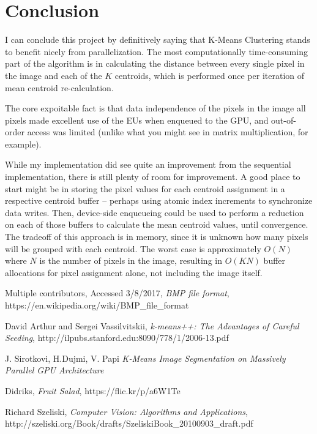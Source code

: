 \documentclass[11pt]{article}
\begin{document}
\section{Conclusion}

I can conclude this project by definitively saying that K-Means Clustering stands to benefit nicely from
parallelization. The most computationally time-consuming part of the algorithm is in calculating the
distance between every single pixel in the image and each of the $K$ centroids, which is performed once
per iteration of mean centroid re-calculation.

The core expoitable fact is that data independence of the pixels in the image all pixels
made excellent use of the EUs when enqueued to the GPU, and out-of-order access was limited (unlike what
you might see in matrix multiplication, for example).

While my implementation did see quite an improvement from the sequential implementation, there is still
plenty of room for improvement. A good place to start might be in storing the pixel values for each
centroid assignment in a respective centroid buffer -- perhaps using atomic index increments to synchronize
data writes. Then, device-side enqueueing could be used to perform a reduction on each of those buffers
to calculate the mean centroid values, until convergence. The tradeoff of this approach is in memory, since it is
unknown how many pixels will be grouped with each centroid. The worst case is approximately $O(N)$ where
$N$ is the number of pixels in the image, resulting in $O(KN)$ buffer allocations for pixel assignment alone,
not including the image itself.

\begin{thebibliography}{9}

  Multiple contributors,
  Accessed 3/8/2017,
  \emph{BMP file format},
  https://en.wikipedia.org/wiki/BMP\_file\_format

  David Arthur and Sergei Vassilvitskii,
  \emph{k-means++: The Advantages of Careful Seeding},
  http://ilpubs.stanford.edu:8090/778/1/2006-13.pdf

  J. Sirotkovi, H.Dujmi, V. Papi
  \emph{K-Means Image Segmentation on Massively Parallel GPU Architecture}

  Didriks,
  \emph{Fruit Salad},
  https://flic.kr/p/a6W1Te

  Richard Szeliski,
  \emph{Computer Vision: Algorithms and Applications},
  http://szeliski.org/Book/drafts/SzeliskiBook\_20100903\_draft.pdf


\end{thebibliography}
\end{document}
